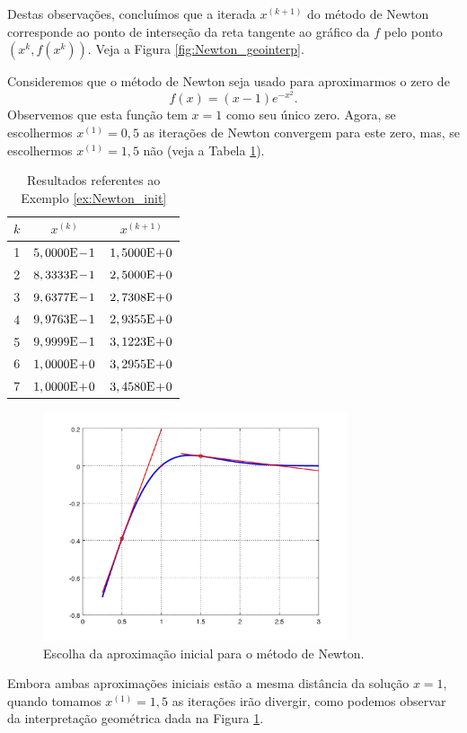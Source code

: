 Destas observações, concluímos que a iterada $x^{(k+1)}$ do método de Newton corresponde ao ponto de interseção da reta tangente ao gráfico da $f$ pelo ponto $(x^{k}, f(x^{k}))$. Veja a Figura \ref{fig:Newton_geointerp}.

\begin{ex}\label{ex:Newton_init}
  Consideremos que o método de Newton seja usado para aproximarmos o zero de
  \begin{equation}
    f(x) = (x-1)e^{-x^2}.
  \end{equation}
Observemos que esta função tem $x=1$ como seu único zero. Agora, se escolhermos $x^{(1)} = 0,5$ as iterações de Newton convergem para este zero, mas, se escolhermos $x^{(1)}=1,5$ não (veja a Tabela \ref{tab:ex_Newton_init}).

\begin{table}[h!]
  \centering
  \caption{Resultados referentes ao Exemplo \ref{ex:Newton_init}}
  \label{tab:ex_Newton_init}
  \begin{tabular}{r|cc}
    $k$ & $x^{(k)}$ & $x^{(k+1)}$ \\\hline
    1 & $5,0000\mathrm{E}\!-\!1$ & $1,5000\mathrm{E}\!+\!0$ \\
    2 & $8,3333\mathrm{E}\!-\!1$ & $2,5000\mathrm{E}\!+\!0$ \\
    3 & $9,6377\mathrm{E}\!-\!1$ & $2,7308\mathrm{E}\!+\!0$ \\
    4 & $9,9763\mathrm{E}\!-\!1$ & $2,9355\mathrm{E}\!+\!0$ \\
    5 & $9,9999\mathrm{E}\!-\!1$ & $3,1223\mathrm{E}\!+\!0$ \\
    6 & $1,0000\mathrm{E}\!+\!0$ & $3,2955\mathrm{E}\!+\!0$ \\
    7 & $1,0000\mathrm{E}\!+\!0$ & $3,4580\mathrm{E}\!+\!0$ \\\hline    
  \end{tabular}
\end{table}

  \begin{figure}[h!]
    \centering
    \includegraphics[width=0.8\textwidth]{./cap_eq1d/dados/ex_Newton_init/fig_ex_Newton_init}
    \caption{Escolha da aproximação inicial para o método de Newton.}
    \label{fig:ex_Newton_init}
  \end{figure}

Embora ambas aproximações iniciais estão a mesma distância da solução $x=1$, quando tomamos $x^{(1)}=1,5$ as iterações irão divergir, como podemos observar da interpretação geométrica dada na Figura \ref{fig:ex_Newton_init}.
\end{ex}

